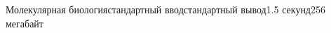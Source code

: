 \begin{problem}{Молекулярная биология}{стандартный ввод}{стандартный вывод}{1.5 секунд}{256 мегабайт}
\Examples

\begin{example}
%
%
\end{example}

\end{problem}

